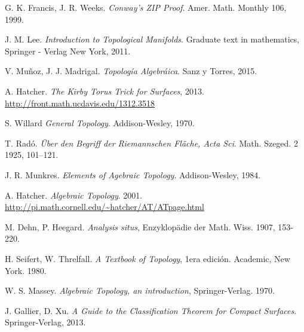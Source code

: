 \documentclass[10pt]{report}
\theoremstyle{definition}
\begin{document}
\begin{thebibliography}{99}

G. K. Francis, J. R. Weeks.
\textit{Conway's ZIP Proof}. Amer. Math. Monthly 106, 1999.

J. M. Lee.
\textit{Introduction to Topological Manifolds}. Graduate text in mathematics, Springer - Verlag New York, 2011.

V. Muñoz, J. J. Madrigal. 
\textit{Topología Algebráica}. Sanz y Torres, 2015.


A. Hatcher.
\textit{The Kirby Torus Trick for Surfaces}, 2013.
\\\url{http://front.math.ucdavis.edu/1312.3518}

S. Willard
\textit{General Topology}. Addison-Wesley, 1970.

T. Radó.
\textit{Über den Begriff der Riemannschen Fläche, Acta Sci}. Math. Szeged. 2 1925,
101–121.

J. R. Munkres.
\textit{Elements of Agebraic Topology}. Addison-Wesley, 1984.

A. Hatcher.
\textit{Algebraic Topology}. 2001. 
\\\url{http://pi.math.cornell.edu/~hatcher/AT/ATpage.html}

M. Dehn, P. Heegard.
\textit{Analysis situs}, Enzyklopädie der Math. Wiss. 1907, 153-220.


H. Seifert, W. Threlfall.
\textit{A Textbook of Topology}, 1era edición. Academic, New York. 1980.

W. S. Massey. 
\textit{Algebraic Topology, an introduction}, Springer-Verlag. 1970.

J. Gallier, D. Xu.
\textit{A Guide to the Classification Theorem for Compact Surfaces}. Springer-Verlag, 2013.

\end{thebibliography}
\end{document}
